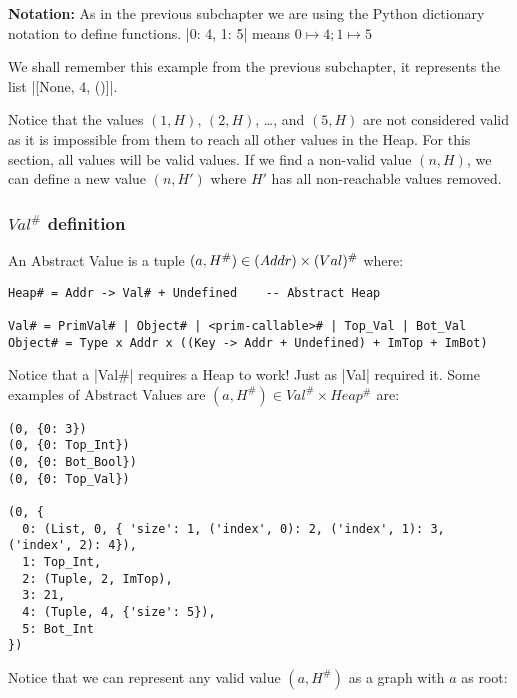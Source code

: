 \textbf{Notation:} As in the previous subchapter we are using the Python
dictionary notation to define functions. \pycode|{0: 4, 1: 5}|
means \(0 \mapsto 4; 1 \mapsto 5\)

We shall remember this example from the previous subchapter, it
represents the list \pycode|[None, 4, ()]|.

Notice that the values \((1, H)\), \((2, H)\), \ldots{}, and \((5, H)\)
are not considered valid as it is impossible from them to reach all
other values in the Heap. For this section, all values will be valid
values. If we find a non-valid value \((n, H)\), we can define a new
value \((n, H')\) where \(H'\) has all non-reachable values removed.

\subsubsection*{\(Val^\#\) definition}

An Abstract Value is a tuple
\((a, H^\#) \in \text(Addr) \times \text(Val)^\#\) where:

\begin{verbatim}
Heap# = Addr -> Val# + Undefined    -- Abstract Heap

Val# = PrimVal# | Object# | <prim-callable># | Top_Val | Bot_Val
Object# = Type x Addr x ((Key -> Addr + Undefined) + ImTop + ImBot)
\end{verbatim}

Notice that a \pycode|Val#| requires a Heap to work! Just as
\pycode|Val| required it. Some examples of Abstract Values are
\((a, H^\#) \in Val^\# \times Heap^\#\) are:

\begin{verbatim}
(0, {0: 3})
(0, {0: Top_Int})
(0, {0: Bot_Bool})
(0, {0: Top_Val})

(0, {
  0: (List, 0, { 'size': 1, ('index', 0): 2, ('index', 1): 3, ('index', 2): 4}),
  1: Top_Int,
  2: (Tuple, 2, ImTop),
  3: 21,
  4: (Tuple, 4, {'size': 5}),
  5: Bot_Int
})
\end{verbatim}

Notice that we can represent any valid value \((a, H^\#)\) as a graph
with \(a\) as root:

{}

